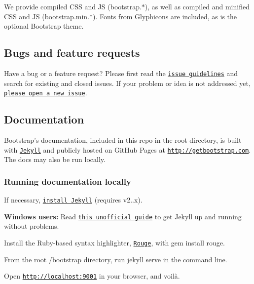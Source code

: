 We provide compiled C\-S\-S and J\-S ({\ttfamily bootstrap.$\ast$}), as well as compiled and minified C\-S\-S and J\-S ({\ttfamily bootstrap.\-min.$\ast$}). Fonts from Glyphicons are included, as is the optional Bootstrap theme.

\subsection*{Bugs and feature requests}

Have a bug or a feature request? Please first read the \href{https://github.com/twbs/bootstrap/blob/master/CONTRIBUTING.md#using-the-issue-tracker}{\tt issue guidelines} and search for existing and closed issues. If your problem or idea is not addressed yet, \href{https://github.com/twbs/bootstrap/issues/new}{\tt please open a new issue}.

\subsection*{Documentation}

Bootstrap's documentation, included in this repo in the root directory, is built with \href{http://jekyllrb.com}{\tt Jekyll} and publicly hosted on Git\-Hub Pages at \href{http://getbootstrap.com}{\tt http\-://getbootstrap.\-com}. The docs may also be run locally.

\subsubsection*{Running documentation locally}


\begin{DoxyEnumerate}
\item If necessary, \href{http://jekyllrb.com/docs/installation}{\tt install Jekyll} (requires v2..\-x).
\begin{DoxyItemize}
\item {\bfseries Windows users\-:} Read \href{http://jekyll-windows.juthilo.com/}{\tt this unofficial guide} to get Jekyll up and running without problems.
\end{DoxyItemize}
\item Install the Ruby-\/based syntax highlighter, \href{https://github.com/jneen/rouge}{\tt Rouge}, with {\ttfamily gem install rouge}.
\item From the root {\ttfamily /bootstrap} directory, run {\ttfamily jekyll serve} in the command line.
\item Open \href{http://localhost:9001}{\tt http\-://localhost\-:9001} in your browser, and voilà.
\end{DoxyEnumerate}

